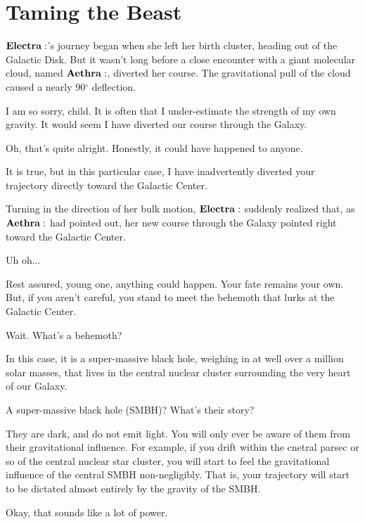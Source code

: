 \section{Taming the Beast}


$\Electra$'s journey began when she left her birth cluster, heading out of the Galactic Disk.  But it wasn't long before a close encounter with a giant molecular cloud, named $\Aethra$, diverted her course.  The gravitational pull of the cloud caused a nearly 90$^{\circ}$ deflection.  

\Aethra I am so sorry, child.  It is often that I under-estimate the strength of my own gravity.  It would seem I have diverted our course through the Galaxy.

\Electra Oh, that's quite alright.  Honestly, it could have happened to anyone.

\Aethra It is true, but in this particular case, I have inadvertently diverted your trajectory directly toward the Galactic Center.

Turning in the direction of her bulk motion, $\Electra$ suddenly realized that, as $\Aethra$ had pointed out, her new course through the Galaxy pointed right toward the Galactic Center.  

\Electras Uh oh...

\Aethra Rest assured, young one, anything could happen.  Your fate remains your own.  But, if you aren't careful, you stand to meet the behemoth that lurks at the Galactic Center.

\Electra Wait.  What's a behemoth?

\Aethra In this case, it is a super-massive black hole, weighing in at well over a million solar masses, that lives in the central nuclear cluster surrounding the very heart of our Galaxy.  

\Electra A super-massive black hole (SMBH)?  What's their story?

\Aethra They are dark, and do not emit light.  You will only ever be aware of them from their gravitational influence.  For example, if you drift within the cnetral parsec or so of the central nuclear star cluster, you will start to feel the gravitational influence of the central SMBH non-negligibly.  That is, your trajectory will start to be dictated almost entirely by the gravity of the SMBH.  

\Electra Okay, that sounds like a lot of power.

